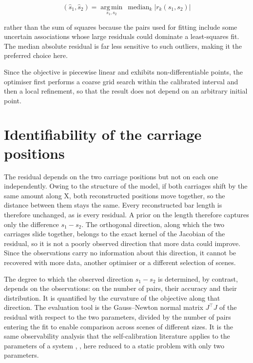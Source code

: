 \documentclass[a4paper, 12pt, twoside]{book}
\newcommand{\citev}[1]{\citeauthor{#1} \citeyear{#1} \cite{#1}}
\begin{document}
\begin{equation}
(\hat s_1, \hat s_2) = \operatorname*{arg\,min}_{s_1, s_2} \ \operatorname{median}_k \left\vert{} r_k(s_1, s_2) \right\vert{}
\label{eq:median-fit}
\end{equation}

rather than the sum of squares because the pairs used for fitting include some uncertain associations whose large residuals could dominate a least-squares fit. The median absolute residual is far less sensitive to such outliers, making it the preferred choice here.

Since the objective is piecewise linear and exhibits non-differentiable points, the optimiser first performs a coarse grid search within the calibrated interval and then a local refinement, so that the result does not depend on an arbitrary initial point.

\section{Identifiability of the carriage positions}
\label{sec:identify-observability}

The residual depends on the two carriage positions but not on each one independently. Owing to the structure of the model, if both carriages shift by the same amount along X, both reconstructed positions move together, so the distance between them stays the same. Every reconstructed bar length is therefore unchanged, as is every residual. A prior on the length therefore captures only the difference $s_1 - s_2$. The orthogonal direction, along which the two carriages slide together, belongs to the exact kernel of the Jacobian of the residual, so it is not a poorly observed direction that more data could improve. Since the observations carry no information about this direction, it cannot be recovered with more data, another optimiser or a different selection of scenes.

The degree to which the observed direction $s_1 - s_2$ is determined, by contrast, depends on the observations: on the number of pairs, their accuracy and their distribution. It is quantified by the curvature of the objective along that direction. The evaluation tool is the Gauss--Newton normal matrix $J^\top J$ of the residual with respect to the two parameters, divided by the number of pairs entering the fit to enable comparison across scenes of different sizes. It is the same observability analysis that the self-calibration literature applies to the parameters of a system \citev{maye2016}, \citev{nobre2019}, here reduced to a static problem with only two parameters.
\end{document}
